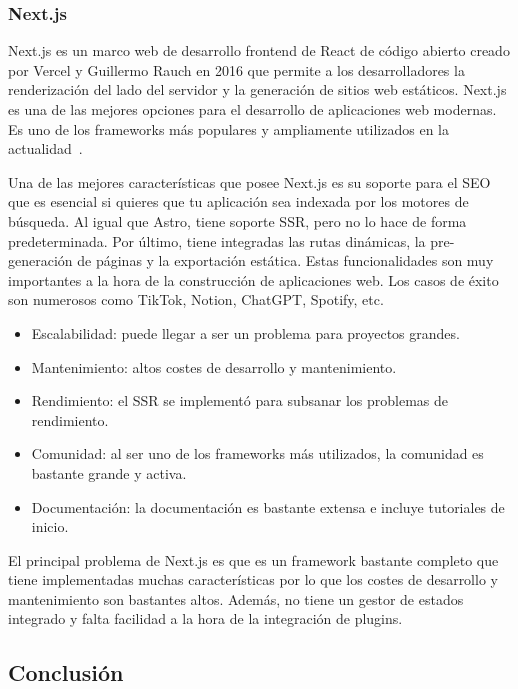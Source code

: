 \subsubsection{Next.js}

Next.js es un marco web de desarrollo frontend de React de código abierto creado por Vercel y Guillermo Rauch en 2016 que permite a los desarrolladores la renderización del lado del servidor y la generación de sitios web estáticos. Next.js es una de las mejores opciones para el desarrollo de aplicaciones web modernas. Es uno de los frameworks más populares y ampliamente utilizados en la actualidad~\cite{nextjs-wikipedia}.

Una de las mejores características que posee Next.js es su soporte para el SEO que es esencial si quieres que tu aplicación sea indexada por los motores de búsqueda. Al igual que Astro, tiene soporte SSR, pero no lo hace de forma predeterminada. Por último, tiene integradas las rutas dinámicas, la pre-generación de páginas y la exportación estática. Estas funcionalidades son muy importantes a la hora de la construcción de aplicaciones web. Los casos de éxito son numerosos como TikTok, Notion, ChatGPT, Spotify, etc.

\begin{itemize}
    \item[\bien] Escalabilidad: puede llegar a ser un problema para proyectos grandes.
    \item[\mal] Mantenimiento: altos costes de desarrollo y mantenimiento.
    \item[\regular] Rendimiento: el SSR se implementó para subsanar los problemas de rendimiento.
    \item[\esp] Comunidad: al ser uno de los frameworks más utilizados, la comunidad es bastante grande y activa.
    \item[\bien] Documentación: la documentación es bastante extensa e incluye tutoriales de inicio.
\end{itemize}

El principal problema de Next.js es que es un framework bastante completo que tiene implementadas muchas características por lo que los costes de desarrollo y mantenimiento son bastantes altos. Además, no tiene un gestor de estados integrado y falta facilidad a la hora de la integración de plugins.

\subsection{Conclusión}

